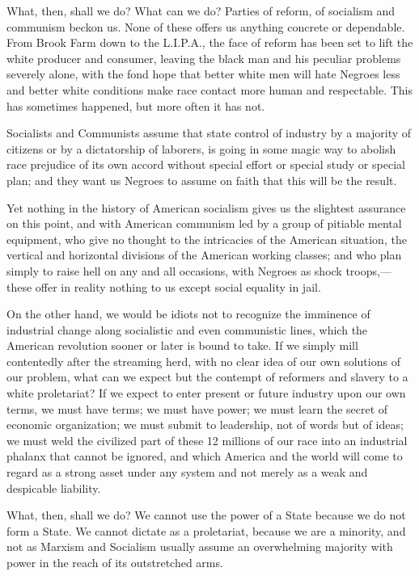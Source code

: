 \documentclass[letterpaper,10pt,english]{jupyterBook}
\begin{document}
\sphinxAtStartPar
What, then, shall we do? What can we do? Parties of reform, of socialism and communism beckon us. None of these offers us anything concrete or dependable. From Brook Farm down to the L.I.P.A., the face of reform has been set to lift the white producer and consumer, leaving the black man and his peculiar problems severely alone, with the fond hope that better white men will hate Negroes less and better white conditions make race contact more human and respectable. This has sometimes happened, but more often it has not.

\sphinxAtStartPar
Socialists and Communists assume that state control of industry by a majority of citizens or by a dictatorship of laborers, is going in some magic way to abolish race prejudice of its own accord without special effort or special study or special plan; and they want us Negroes to assume on faith that this will be the result.

\sphinxAtStartPar
Yet nothing in the history of American socialism gives us the slightest assurance on this point, and with American communism led by a group of pitiable mental equipment, who give no thought to the intricacies of the American situation, the vertical and horizontal divisions of the American working classes; and who plan simply to raise hell on any and all occasions, with Negroes as shock troops,—these offer in reality nothing to us except social equality in jail.

\sphinxAtStartPar
On the other hand, we would be idiots not to recognize the imminence of industrial change along socialistic and even communistic lines, which the American revolution sooner or later is bound to take. If we simply mill contentedly after the streaming herd, with no clear idea of our own solutions of our problem, what can we expect but the contempt of reformers and slavery to a white proletariat? If we expect to enter present or future industry upon our own terms, we must have terms; we must have power; we must learn the secret of economic organization; we must submit to leadership, not of words but of ideas; we must weld the civilized part of these 12 millions of our race into an industrial phalanx that cannot be ignored, and which America  and the world will come to regard as a strong asset under any system and not merely as a weak and despicable liability.



\sphinxAtStartPar
What, then, shall we do? We cannot use the power of a State because we do not form a State. We cannot dictate as a proletariat, because we are a minority, and not as Marxism and Socialism usually assume an overwhelming majority with power in the reach of its outstretched arms.
\end{document}
